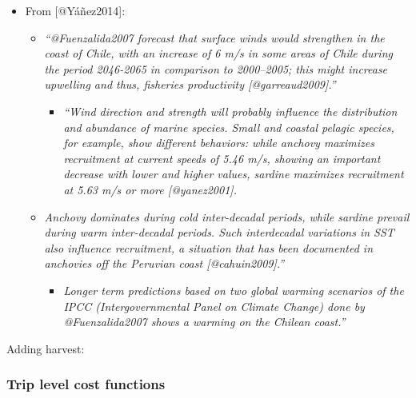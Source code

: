 \begin{itemize}
\tightlist
\item
  From {[}@Yáñez2014{]}:

  \begin{itemize}
  \tightlist
  \item
    \emph{``@Fuenzalida2007 forecast that surface winds would strengthen
    in the coast of Chile, with an increase of 6 m/s in some areas of
    Chile during the period 2046-2065 in comparison to 2000--2005; this
    might increase upwelling and thus, fisheries productivity
    {[}@garreaud2009{]}.''}

    \begin{itemize}
    \tightlist
    \item
      \emph{``Wind direction and strength will probably influence the
      distribution and abundance of marine species. Small and coastal
      pelagic species, for example, show different behaviors: while
      anchovy maximizes recruitment at current speeds of 5.46 m/s,
      showing an important decrease with lower and higher values,
      sardine maximizes recruitment at 5.63 m/s or more
      {[}@yanez2001{]}.}
    \end{itemize}
  \item
    \emph{Anchovy dominates during cold inter-decadal periods, while
    sardine prevail during warm inter-decadal periods. Such interdecadal
    variations in SST also influence recruitment, a situation that has
    been documented in anchovies off the Peruvian coast
    {[}@cahuin2009{]}.''}

    \begin{itemize}
    \tightlist
    \item
      \emph{Longer term predictions based on two global warming
      scenarios of the IPCC (Intergovernmental Panel on Climate Change)
      done by @Fuenzalida2007 shows a warming on the Chilean coast.''}
    \end{itemize}
  \end{itemize}
\end{itemize}

Adding harvest:

\hypertarget{trip-level-cost-functions}{%
\subsubsection{Trip level cost
functions}\label{trip-level-cost-functions}}

